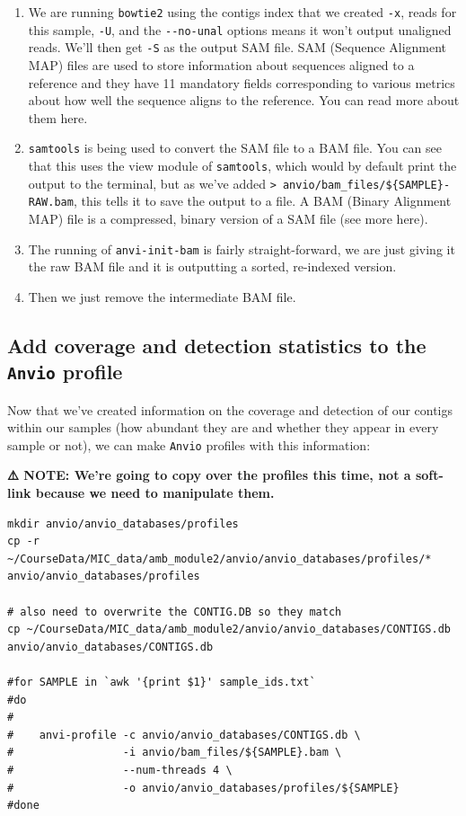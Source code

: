 \documentclass[
]{book}
\providecommand{\tightlist}{%
  \setlength{\itemsep}{0pt}\setlength{\parskip}{0pt}}
\begin{document}
\begin{enumerate}
\def\labelenumi{\arabic{enumi}.}
\tightlist
\item
  We are running \texttt{bowtie2} using the contigs index that we created \texttt{-x}, reads for this sample, \texttt{-U}, and the \texttt{-\/-no-unal} options means it won't output unaligned reads. We'll then get \texttt{-S} as the output SAM file. SAM (Sequence Alignment MAP) files are used to store information about sequences aligned to a reference and they have 11 mandatory fields corresponding to various metrics about how well the sequence aligns to the reference. You can read more about them here.
\item
  \texttt{samtools} is being used to convert the SAM file to a BAM file. You can see that this uses the view module of \texttt{samtools}, which would by default print the output to the terminal, but as we've added \texttt{\textgreater{}\ anvio/bam\_files/\$\{SAMPLE\}-RAW.bam}, this tells it to save the output to a file. A BAM (Binary Alignment MAP) file is a compressed, binary version of a SAM file (see more here).
\item
  The running of \texttt{anvi-init-bam} is fairly straight-forward, we are just giving it the raw BAM file and it is outputting a sorted, re-indexed version.
\item
  Then we just remove the intermediate BAM file.
\end{enumerate}

\subsection{\texorpdfstring{Add coverage and detection statistics to the \texttt{Anvi\textquotesingle{}o} profile}{Add coverage and detection statistics to the Anvi\textquotesingle o profile}}\label{add-coverage-and-detection-statistics-to-the-anvio-profile}

Now that we've created information on the coverage and detection of our contigs within our samples (how abundant they are and whether they appear in every sample or not), we can make \texttt{Anvi\textquotesingle{}o} profiles with this information:

\textbf{⚠️ NOTE: We're going to copy over the profiles this time, not a soft-link because we need to manipulate them.}

\begin{verbatim}
mkdir anvio/anvio_databases/profiles
cp -r ~/CourseData/MIC_data/amb_module2/anvio/anvio_databases/profiles/* anvio/anvio_databases/profiles

# also need to overwrite the CONTIG.DB so they match
cp ~/CourseData/MIC_data/amb_module2/anvio/anvio_databases/CONTIGS.db  anvio/anvio_databases/CONTIGS.db 

#for SAMPLE in `awk '{print $1}' sample_ids.txt`
#do
#
#    anvi-profile -c anvio/anvio_databases/CONTIGS.db \
#                 -i anvio/bam_files/${SAMPLE}.bam \
#                 --num-threads 4 \
#                 -o anvio/anvio_databases/profiles/${SAMPLE}
#done
\end{verbatim}
\end{document}
